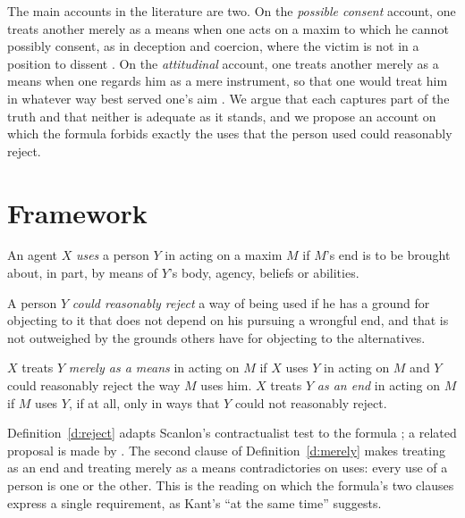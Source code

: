\documentclass{situationist-preprint}
\begin{document}
The main accounts in the literature are two. On the \emph{possible consent} account, one treats another merely as a means when one acts on a maxim to which he cannot possibly consent, as in deception and coercion, where the victim is not in a position to dissent \citep{ONeill1985,Korsgaard1986}. On the \emph{attitudinal} account, one treats another merely as a means when one regards him as a mere instrument, so that one would treat him in whatever way best served one's aim \citep{Parfit2011}. We argue that each captures part of the truth and that neither is adequate as it stands, and we propose an account on which the formula forbids exactly the uses that the person used could reasonably reject.

\section{Framework}

\begin{definition}[Use]\label{d:use}
An agent $X$ \emph{uses} a person $Y$ in acting on a maxim $M$ if $M$'s end is to be brought about, in part, by means of $Y$'s body, agency, beliefs or abilities.
\end{definition}

\begin{definition}\label{d:reject}
A person $Y$ \emph{could reasonably reject} a way of being used if he has a ground for objecting to it that does not depend on his pursuing a wrongful end, and that is not outweighed by the grounds others have for objecting to the alternatives.
\end{definition}

\begin{definition}\label{d:merely}
$X$ treats $Y$ \emph{merely as a means} in acting on $M$ if $X$ uses $Y$ in acting on $M$ and $Y$ could reasonably reject the way $M$ uses him. $X$ treats $Y$ \emph{as an end} in acting on $M$ if $M$ uses $Y$, if at all, only in ways that $Y$ could not reasonably reject.
\end{definition}

Definition~\ref{d:reject} adapts Scanlon's contractualist test to the formula \citep{Scanlon1998}; a related proposal is made by \citet{Kerstein2013}. The second clause of Definition~\ref{d:merely} makes treating as an end and treating merely as a means contradictories on uses: every use of a person is one or the other. This is the reading on which the formula's two clauses express a single requirement, as Kant's \enquote{at the same time} suggests.
\end{document}
